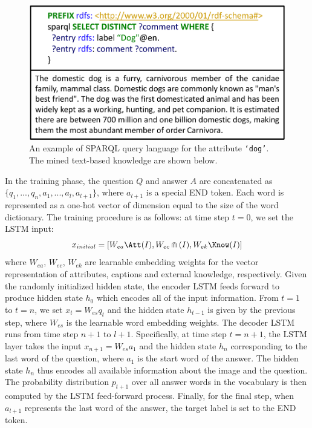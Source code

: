 \begin{figure}[t]
  \centering
  \includegraphics[width=0.9\linewidth]{img/rdf_example.pdf}
  \vspace{-3pt}
  \caption{An example of SPARQL query language for the attribute \texttt{`dog'}. The mined text-based knowledge are shown below.}
  \label{img:example_rdf}
  \vspace{-13pt}
\end{figure}

In the training phase, the question $Q$ and answer $A$ are concatenated as $\{q_1,...,q_n,a_1,...,a_l,a_{l+1}\}$, where $a_{l+1}$ is a special END token. Each word is represented as a one-hot vector of dimension equal to the size of the word dictionary. The training procedure is as follows: at time step $t=0$, we set the LSTM input: 
\begin{equation}
   x_{initial}=[ W_{ea}\Att(I), W_{ec}\Cap(I), W_{ek}\Know(I) ] 
\end{equation}
where $W_{ea}$, $W_{ec}$, $W_{ek}$ are learnable embedding weights for the vector representation of attributes, captions and external knowledge, respectively. Given the randomly initialized hidden state, the encoder LSTM feeds forward to produce  hidden state $h_{0}$ which encodes all of the input information. From $t=1$ to $t=n$, we set $x_t=W_{es}q_t$ and the hidden state $h_{t-1}$ is given by the previous step, where $W_{es}$ is the learnable word embedding weights. The decoder LSTM runs from time step $n+1$ to $l+1$. Specifically, at time step $t=n+1$, the LSTM layer takes the input $x_{n+1}=W_{es}a_1$ and the hidden state $h_{n}$ corresponding to the last word of the question, where $a_1$ is the start word of the answer. The hidden state $h_{n}$ thus encodes all available information about the image and the question. The probability distribution $p_{t+1}$ over all answer words in the vocabulary is then computed by the LSTM feed-forward process. Finally, for the final step, when $a_{l+1}$ represents the last word of the answer, the target label is set to the END token.

